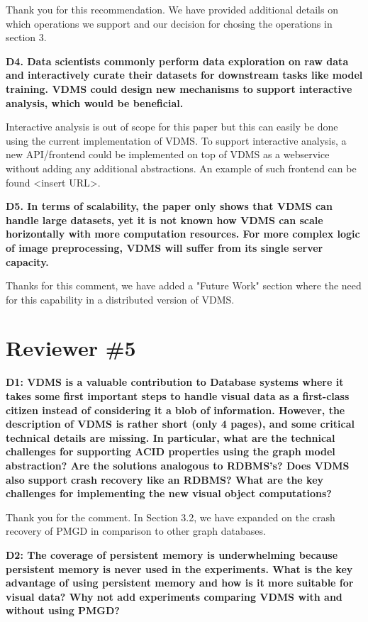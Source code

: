 \documentclass[11pt]{proposalnsf}
\begin{document}
Thank you for this recommendation.  We have provided additional details on which operations we support and our decision for chosing the operations in section 3.

\bigskip
\textbf{
D4. Data scientists commonly perform data exploration on raw data and interactively curate their datasets for downstream tasks like model training. VDMS could design new mechanisms to support interactive analysis, which would be beneficial.
}\bigskip

Interactive analysis is out of scope for this paper but this can easily be done using the current implementation of VDMS.  To support interactive analysis, a new API/frontend could be implemented on top of VDMS as a webservice without adding any additional abstractions. An example of such frontend can be found <insert URL>.

\bigskip
\textbf{
D5. In terms of scalability, the paper only shows that VDMS can handle large datasets, yet it is not known how VDMS can scale horizontally with more computation resources. For more complex logic of image preprocessing, VDMS will suffer from its single server capacity.
}\bigskip

Thanks for this comment, we have added a "Future Work" section where the need for this capability in a distributed version of VDMS.

\newpage
\section{Reviewer \#5}

\bigskip
\textbf{
D1: VDMS is a valuable contribution to Database systems where it takes
some first important steps to handle visual data as a first-class citizen
instead of considering it a blob of information. However, the description
of VDMS is rather short (only 4 pages), and some critical technical
details are missing. In particular, what are the technical challenges
for supporting ACID properties using the graph model abstraction? Are
the solutions analogous to RDBMS’s? Does VDMS also support crash
recovery like an RDBMS? What are the key challenges for implementing
the new visual object computations?
}\bigskip

Thank you for the comment.  In Section 3.2, we have expanded on the crash recovery of PMGD in comparison to other graph databases.

\bigskip
\textbf{
D2: The coverage of persistent memory is underwhelming because persistent memory is never used in the experiments. What is the key advantage of using persistent memory and how is it more suitable for visual data? Why not add experiments comparing VDMS with and without using PMGD?
}\bigskip
\end{document}
